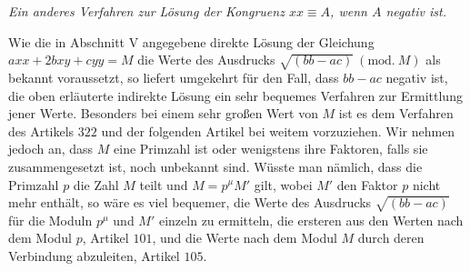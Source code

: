 \begin{center}\textit{Ein anderes Verfahren zur Lösung der Kongruenz \(xx\equiv A\), wenn \(A\) negativ ist.}\end{center}


Wie die in Abschnitt V angegebene direkte Lösung der Gleichung \(axx+2bxy+cyy=M\) die Werte des Ausdrucks \(\surd{(bb-ac)}\ (\mathrm{mod.}\ M)\) als bekannt voraussetzt, so liefert umgekehrt für den Fall, dass \(bb-ac\) negativ ist, die oben erläuterte indirekte Lösung ein sehr bequemes Verfahren zur Ermittlung jener Werte. Besonders bei einem sehr großen Wert von \(M\) ist es dem Verfahren des Artikels \(322\) und der folgenden Artikel bei weitem vorzuziehen. Wir nehmen jedoch an, dass \(M\) eine Primzahl ist oder wenigstens ihre Faktoren, falls sie zusammengesetzt ist,
noch unbekannt sind. Wüsste man nämlich, dass die Primzahl \(p\) die Zahl \(M\) teilt und \(M=p^\mu M'\) gilt, wobei \(M'\) den Faktor \(p\) nicht mehr enthält, so wäre es viel bequemer, die Werte des Ausdrucks \(\surd{(bb-ac)}\) für die Moduln \(p^\mu\) und \(M'\) einzeln zu ermitteln, die ersteren aus den Werten nach dem Modul \(p\), Artikel \(101\), und die Werte nach dem Modul \(M\) durch deren Verbindung abzuleiten, Artikel \(105\).

